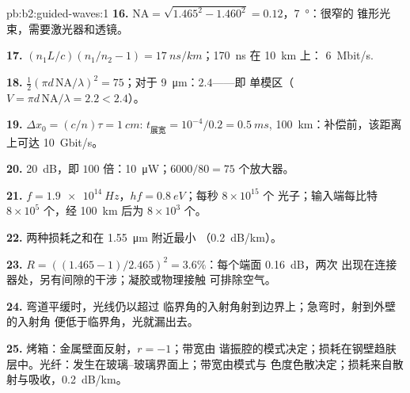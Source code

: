 \begin{solution}{pb:b2:guided-waves:1}
\textbf{16.} $\mathrm{NA} = \sqrt{1.465^2 - 1.460^2} = 0.12$，\qty{7}{\degree}：很窄的
锥形光束，需要激光器和透镜。

\textbf{17.} $(n_1L/c)(n_1/n_2 - 1) = \qty{17}{ns/km}$；\qty{170}{ns} 在 \qty{10}{km} 上：
\qty{6}{Mbit/s}.

\textbf{18.} $\tfrac12(\pi d\,\mathrm{NA}/\lambda)^2 = 75$；对于 \qty{9}{\micro m}：$2.4$——即
单模区（$V = \pi d\,\mathrm{NA}/\lambda = 2.2 < 2.4$）。

\textbf{19.} $\Delta x_0 = (c/n)\tau = \qty{1}{cm}$: $t_{\text{展宽}} = 10^{-4}/0.2 = \qty{0.5}{ms}$,
\qty{100}{km}：补偿前，该距离上可达 \qty{10}{Gbit/s}。

\textbf{20.} \qty{20}{dB}，即 $100$ 倍：\qty{10}{\micro W}；$6000/80 = 75$
个放大器。

\textbf{21.} $f = \qty{1.9e14}{Hz}$，$hf = \qty{0.8}{eV}$；每秒 $8 \times 10^{15}$ 个
光子；输入端每比特 $8 \times 10^5$ 个，经 \qty{100}{km} 后为 $8 \times 10^3$ 个。

\textbf{22.} 两种损耗之和在 \qty{1.55}{\micro m} 附近最小
（\qty{0.2}{dB/km}）。

\textbf{23.} $R = ((1.465 - 1)/2.465)^2 = 3.6\%$：每个端面 \qty{0.16}{dB}，两次
出现在连接器处，另有间隙的干涉；凝胶或物理接触
可排除空气。

\textbf{24.} 弯道平缓时，光线仍以超过
临界角的入射角射到边界上；急弯时，射到外壁的入射角
便低于临界角，光就漏出去。

\textbf{25.} 烤箱：金属壁面反射，$r = -1$；带宽由
谐振腔的模式决定；损耗在钢壁趋肤层中。光纤：发生在玻璃–玻璃界面上；带宽由模式与
色度色散决定；损耗来自散射与吸收，\qty{0.2}{dB/km}。
\end{solution}
